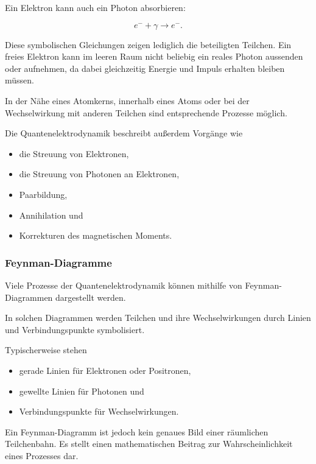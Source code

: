 Ein Elektron kann auch ein Photon absorbieren:

\begin{equation}
	e^-
	+
	\gamma
	\longrightarrow
	e^-.
	\label{eq:elektron_absorption_photon_symbolisch}
\end{equation}

Diese symbolischen Gleichungen zeigen lediglich die beteiligten
Teilchen. Ein freies Elektron kann im leeren Raum nicht beliebig ein
reales Photon aussenden oder aufnehmen, da dabei gleichzeitig Energie
und Impuls erhalten bleiben müssen.

In der Nähe eines Atomkerns, innerhalb eines Atoms oder bei der
Wechselwirkung mit anderen Teilchen sind entsprechende Prozesse
möglich.

Die Quantenelektrodynamik beschreibt außerdem Vorgänge wie

\begin{itemize}
	\item die Streuung von Elektronen,
	\item die Streuung von Photonen an Elektronen,
	\item Paarbildung,
	\item Annihilation und
	\item Korrekturen des magnetischen Moments.
\end{itemize}

\subsubsection*{Feynman-Diagramme}

Viele Prozesse der Quantenelektrodynamik können mithilfe von
Feynman-Diagrammen%
dargestellt werden.

In solchen Diagrammen werden Teilchen und ihre Wechselwirkungen durch
Linien und Verbindungspunkte symbolisiert.

Typischerweise stehen

\begin{itemize}
	\item gerade Linien für Elektronen oder Positronen,
	\item gewellte Linien für Photonen und
	\item Verbindungspunkte für Wechselwirkungen.
\end{itemize}

Ein Feynman-Diagramm ist jedoch kein genaues Bild einer räumlichen
Teilchenbahn. Es stellt einen mathematischen Beitrag zur
Wahrscheinlichkeit eines Prozesses dar.

